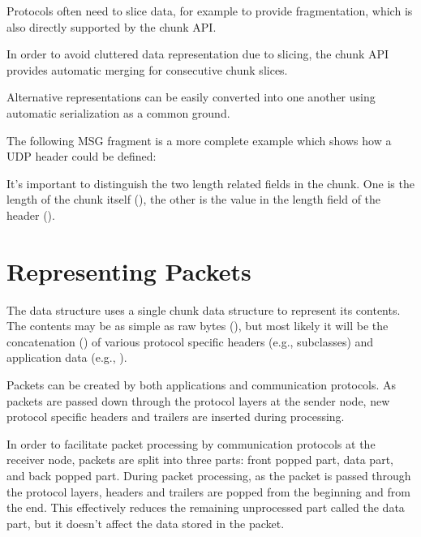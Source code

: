 
Protocols often need to slice data, for example to provide fragmentation, which
is also directly supported by the chunk API.


In order to avoid cluttered data representation due to slicing, the chunk API
provides automatic merging for consecutive chunk slices.


Alternative representations can be easily converted into one another using
automatic serialization as a common ground.


The following MSG fragment is a more complete example which shows how a UDP
header could be defined:


It's important to distinguish the two length related fields in the
 chunk. One is the length of the chunk itself
(), the other is the value in the length field of the header
().

\section{Representing Packets}
\label{sec:packets:representing-packets}

The  data structure uses a single chunk data structure to
represent its contents. The contents may be as simple as raw bytes
(), but most likely it will be the concatenation
() of various protocol specific headers (e.g.,
 subclasses) and application data (e.g.,
).

Packets can be created by both applications and communication protocols. As
packets are passed down through the protocol layers at the sender node, new
protocol specific headers and trailers are inserted during processing.


In order to facilitate packet processing by communication protocols at the
receiver node, packets are split into three parts: front popped part, data part,
and back popped part. During packet processing, as the packet is passed through
the protocol layers, headers and trailers are popped from the beginning and from
the end. This effectively reduces the remaining unprocessed part called the data
part, but it doesn't affect the data stored in the packet.

